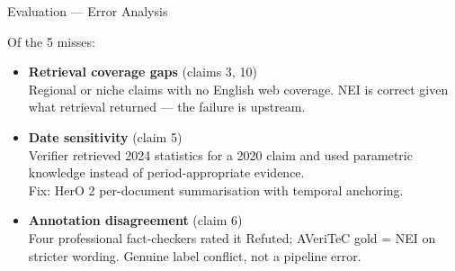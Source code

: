 \documentclass[11pt, aspectratio=169]{beamer}
\begin{document}
\begin{frame}{Evaluation — Error Analysis}

  Of the 5 misses:

  \bigskip
  \begin{itemize}\setlength{\itemsep}{14pt}
    \item \textbf{Retrieval coverage gaps} (claims 3, 10)\\
          Regional or niche claims with no English web coverage.
          NEI is correct given what retrieval returned — the failure is upstream.
    \item \textbf{Date sensitivity} (claim 5)\\
          Verifier retrieved 2024 statistics for a 2020 claim and used parametric
          knowledge instead of period-appropriate evidence.\\
          {\small\textcolor{steel}{Fix: HerO 2 per-document summarisation with temporal anchoring.}}
    \item \textbf{Annotation disagreement} (claim 6)\\
          Four professional fact-checkers rated it Refuted; AVeriTeC gold = NEI on stricter wording.
          Genuine label conflict, not a pipeline error.
  \end{itemize}
\end{frame}
\end{document}
